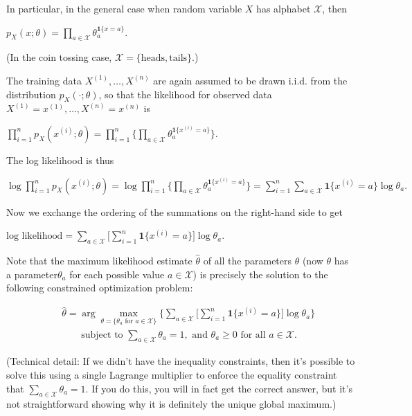 In particular, in the general case when random variable $X$ has alphabet $\mathcal{X}$, then

{\centering$p_{X}(x;\theta )=\prod _{a\in \mathcal{X}}\theta _{a}^{\mathbf{1}\{ x=a\} }.$ \par}

(In the coin tossing case, $\mathcal{X}=\{ \text {heads},\text {tails}\}$.)

The training data $X^{(1)},\dots ,X^{(n)}$ are again assumed to be drawn i.i.d. from the distribution $p_{X}(\cdot ;\theta )$, so that the likelihood for observed data $X^{(1)}=x^{(1)},\dots ,X^{(n)}=x^{(n)}$ is

{\centering$\prod _{i=1}^{n}p_{X}(x^{(i)};\theta )=\prod _{i=1}^{n}\bigg\{ \prod _{a\in \mathcal{X}}\theta _{a}^{\mathbf{1}\{ x^{(i)}=a\} }\bigg\} .$ \par}
 
The log likelihood is thus

{\centering$\log \prod _{i=1}^{n}p_{X}(x^{(i)};\theta )=\log \prod _{i=1}^{n}\bigg\{ \prod _{a\in \mathcal{X}}\theta _{a}^{\mathbf{1}\{ x^{(i)}=a\} }\bigg\} =\sum _{i=1}^{n}\sum _{a\in \mathcal{X}}\mathbf{1}\{ x^{(i)}=a\} \log \theta _{a}.$ \par}
 
Now we exchange the ordering of the summations on the right-hand side to get

{\centering$\text {log likelihood}=\sum _{a\in \mathcal{X}}\bigg[\sum _{i=1}^{n}\mathbf{1}\{ x^{(i)}=a\} \bigg]\log \theta _{a}.$ \par}
 
Note that the maximum likelihood estimate $\widehat{\theta }$ of all the parameters $\theta$ (now $\theta$ has a parameter$\theta _{a}$ for each possible value $a\in \mathcal{X}$) is precisely the solution to the following constrained optimization problem:

\begin{eqnarray*}
 &  & \widehat{\theta}=\arg\max_{\theta = \{ \theta_a \text{ for }a\in\mathcal{X} \}}\bigg\{\sum_{a\in\mathcal{X}}\bigg[\sum_{i=1}^{n}\mathbf{1}\{x^{(i)}=a\}\bigg]\log\theta_{a}\bigg\}\\
 &  & \qquad\text{subject to }\sum_{a\in\mathcal{X}}\theta_{a}=1,\text{ and }\theta_{a}\ge0\text{ for all }a\in\mathcal{X}.
\end{eqnarray*}

(Technical detail: If we didn't have the inequality constraints, then it's possible to solve this using a single Lagrange multiplier to enforce the equality constraint that $\sum _{a\in \mathcal{X}}\theta _{a}=1$. If you do this, you will in fact get the correct answer, but it's not straightforward showing why it is definitely the unique global maximum.)

